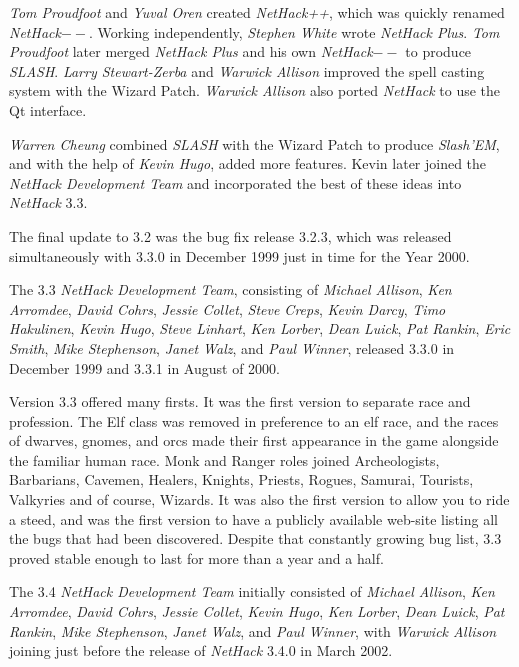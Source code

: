 \medskip
{\it Tom Proudfoot} and {\it Yuval Oren} created {\it NetHack++},
which was quickly renamed {\it NetHack$--$}.
Working independently, {\it Stephen White} wrote {\it NetHack Plus}.
{\it Tom Proudfoot} later merged {\it NetHack Plus}
and his own {\it NetHack$--$} to produce {\it SLASH}.
{\it Larry Stewart-Zerba} and {\it Warwick Allison} improved the spell
casting system with the Wizard Patch.
{\it Warwick Allison} also ported {\it NetHack\/} to use the Qt interface.

\medskip
{\it Warren Cheung} combined {\it SLASH} with the Wizard Patch
to produce {\it Slash'EM\/}, and
with the help of {\it Kevin Hugo}, added more features.
Kevin later joined the
{\it NetHack Development Team} and incorporated the best of these ideas into {\it NetHack\/} 3.3.

\medskip
The final update to 3.2 was the bug fix release 3.2.3, which was released
simultaneously with 3.3.0 in December 1999 just in time for the Year 2000.

\medskip
The 3.3 {\it NetHack Development Team}, consisting of {\it Michael Allison}, {\it Ken Arromdee},
{\it David Cohrs}, {\it Jessie Collet}, {\it Steve Creps}, {\it Kevin Darcy},
{\it Timo Hakulinen}, {\it Kevin Hugo}, {\it Steve Linhart}, {\it Ken Lorber},
{\it Dean Luick}, {\it Pat Rankin}, {\it Eric Smith}, {\it Mike Stephenson},
{\it Janet Walz}, and {\it Paul Winner}, released 3.3.0 in
December 1999 and 3.3.1 in August of 2000.

\medskip
Version 3.3 offered many firsts. It was the first version to separate race
and profession. The Elf class was removed in preference to an elf race,
and the races of dwarves, gnomes, and orcs made their first appearance in
the game alongside the familiar human race.  Monk and Ranger roles joined
Archeologists, Barbarians, Cavemen, Healers, Knights, Priests, Rogues, Samurai,
Tourists, Valkyries and of course, Wizards.  It was also the first version
to allow you to ride a steed, and was the first version to have a publicly
available web-site listing all the bugs that had been discovered.  Despite
that constantly growing bug list, 3.3 proved stable enough to last for
more than a year and a half.

\medskip
The 3.4 {\it NetHack Development Team} initially consisted of
{\it Michael Allison}, {\it Ken Arromdee},
{\it David Cohrs}, {\it Jessie Collet}, {\it Kevin Hugo}, {\it Ken Lorber},
{\it Dean Luick}, {\it Pat Rankin}, {\it Mike Stephenson},
{\it Janet Walz}, and {\it Paul Winner}, with {\it  Warwick Allison} joining
just before the release of {\it NetHack\/} 3.4.0 in March 2002.

